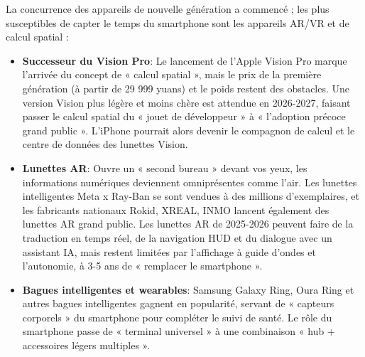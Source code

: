 


La concurrence des appareils de nouvelle génération a commencé ; les plus susceptibles de capter le temps du smartphone sont les appareils AR/VR et de calcul spatial :

\begin{itemize}
  \item \textbf{Successeur du Vision Pro}: Le lancement de l'Apple Vision Pro marque l'arrivée du concept de « calcul spatial », mais le prix de la première génération (à partir de 29 999 yuans) et le poids restent des obstacles. Une version Vision plus légère et moins chère est attendue en 2026-2027, faisant passer le calcul spatial du « jouet de développeur » à « l'adoption précoce grand public ». L'iPhone pourrait alors devenir le compagnon de calcul et le centre de données des lunettes Vision.
  \item \textbf{Lunettes AR}: Ouvre un « second bureau » devant vos yeux, les informations numériques deviennent omniprésentes comme l'air. Les lunettes intelligentes Meta x Ray-Ban se sont vendues à des millions d'exemplaires, et les fabricants nationaux Rokid, XREAL, INMO lancent également des lunettes AR grand public. Les lunettes AR de 2025-2026 peuvent faire de la traduction en temps réel, de la navigation HUD et du dialogue avec un assistant IA, mais restent limitées par l'affichage à guide d'ondes et l'autonomie, à 3-5 ans de « remplacer le smartphone ».
  \item \textbf{Bagues intelligentes et wearables}: Samsung Galaxy Ring, Oura Ring et autres bagues intelligentes gagnent en popularité, servant de « capteurs corporels » du smartphone pour compléter le suivi de santé. Le rôle du smartphone passe de « terminal universel » à une combinaison « hub + accessoires légers multiples ».
\end{itemize}


